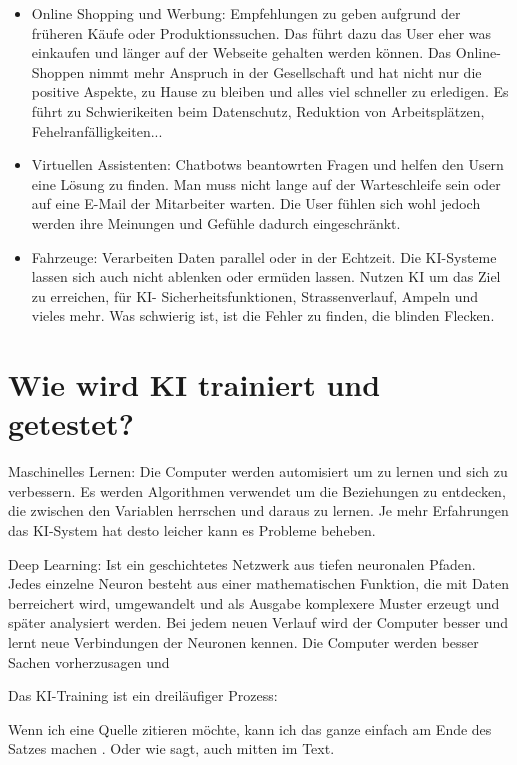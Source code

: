\documentclass{report}
\begin{document}
\begin{itemize}
    \item Online Shopping und Werbung: Empfehlungen zu geben aufgrund der früheren Käufe oder Produktionssuchen.
    Das führt dazu das User eher was einkaufen und länger auf der Webseite gehalten werden können. Das Online-Shoppen nimmt mehr Anspruch in der Gesellschaft und hat nicht nur die positive Aspekte, zu Hause zu bleiben und alles viel schneller zu erledigen.
    Es führt zu Schwierikeiten beim Datenschutz, Reduktion von Arbeitsplätzen, Fehelranfälligkeiten... 
    \item Virtuellen Assistenten: Chatbotws beantowrten Fragen und helfen den Usern eine Lösung zu finden. Man muss nicht lange auf der Warteschleife sein oder auf eine E-Mail der Mitarbeiter warten.
    Die User fühlen sich wohl jedoch werden ihre Meinungen und Gefühle dadurch eingeschränkt.
    \item Fahrzeuge: Verarbeiten Daten parallel oder in der Echtzeit. Die KI-Systeme lassen sich auch nicht ablenken oder ermüden lassen. Nutzen KI um das Ziel zu erreichen, für KI- Sicherheitsfunktionen, Strassenverlauf, Ampeln und vieles mehr.
    Was schwierig ist, ist die Fehler zu finden, die blinden Flecken. 
   
\end{itemize}





\section{Wie wird KI trainiert und getestet?}

Maschinelles Lernen:
Die Computer werden automisiert um zu lernen und sich zu verbessern. Es werden Algorithmen verwendet um die Beziehungen zu entdecken, die zwischen den Variablen herrschen und daraus zu lernen. Je mehr Erfahrungen das KI-System hat desto leicher kann es Probleme beheben.

Deep Learning:
Ist ein geschichtetes Netzwerk aus tiefen neuronalen Pfaden. Jedes einzelne Neuron besteht aus einer mathematischen Funktion, die mit Daten berreichert wird, umgewandelt und als Ausgabe komplexere Muster erzeugt und später  analysiert werden.
Bei jedem neuen Verlauf wird der Computer besser und lernt neue Verbindungen der Neuronen kennen. Die Computer werden besser Sachen vorherzusagen und   
 
Das KI-Training ist ein dreiläufiger Prozess:

 

Wenn ich eine Quelle zitieren möchte, kann ich das ganze einfach am Ende des Satzes machen \citep{example}. Oder wie \citet{example} sagt, auch mitten im Text.

\printbibliography
\end{document}
